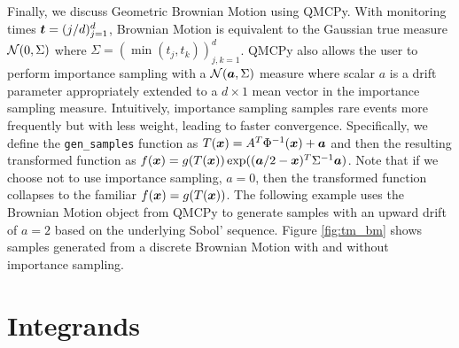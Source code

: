 \documentclass[graybox,footinfo]{svmult}
\begin{document}



Finally, we discuss Geometric Brownian Motion using QMCPy. With monitoring times ${\boldsymbol{t}} = (j/d)_{j=1}^d$, Brownian Motion is equivalent to the Gaussian true measure ${\mathcal{N}}(0,\Sigma)$ where $\Sigma = (\min(t_j,t_k))_{j,k=1}^d$. QMCPy also allows the user to perform importance sampling with a ${\mathcal{N}}({\boldsymbol{a}},\Sigma)$ measure where scalar $a$ is a drift parameter appropriately extended to a $d \times 1$ mean vector in the importance sampling measure. Intuitively, importance sampling samples rare events more frequently but with less weight, leading to faster convergence. Specifically, we define the \texttt{gen\_samples} function as $T({\boldsymbol{x}}) = A^T\Phi^{-1}({\boldsymbol{x}}) + {\boldsymbol{a}}$ and then the resulting transformed function as $f({\boldsymbol{x}}) = g(T({\boldsymbol{x}}))\exp(({\boldsymbol{a}}/2-{\boldsymbol{x}})^T\Sigma^{-1}{\boldsymbol{a}})$. Note that if we choose not to use importance sampling, $a=0$, then the transformed function collapses to the familiar $f({\boldsymbol{x}}) = g(T({\boldsymbol{x}}))$. The following example uses the Brownian Motion object from QMCPy to generate samples with an upward drift of $a=2$ based on the underlying Sobol' sequence. Figure \ref{fig:tm_bm} shows samples generated from a discrete Brownian Motion with and without importance sampling. 



\fi

\section{Integrands}
\end{document}
